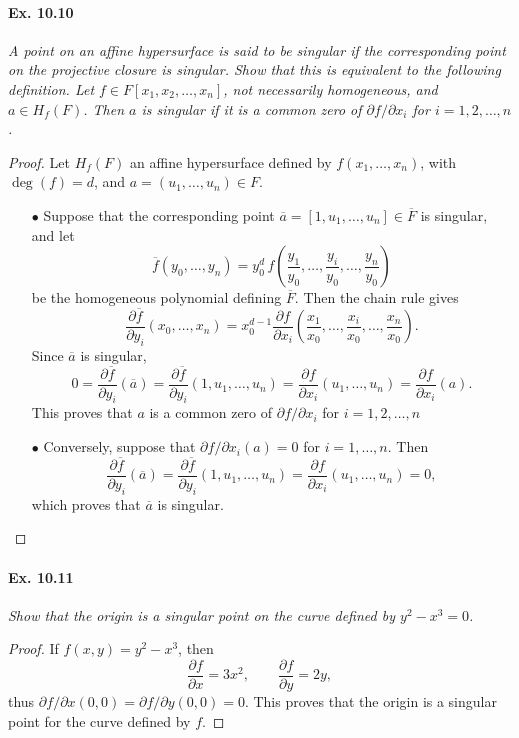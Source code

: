 \documentclass[11pt,a4paper]{article}
\begin{document}
\paragraph{Ex. 10.10} {\it A point on an affine hypersurface is said to be singular if the corresponding point on the projective closure is singular. Show that this is equivalent to the following definition. Let $f \in F[x_1,x_2,\ldots,x_n]$, not necessarily homogeneous, and $a \in H_f(F)$. Then $a$ is singular if it is a common zero of $\partial f/\partial x_i$ for $i=1,2,\ldots,n$.
}

\begin{proof}
Let $H_f(F)$ an affine hypersurface defined by $f(x_1,\ldots,x_n)$, with $\deg(f) = d$, and $a = (u_1,\ldots,u_n) \in F$.
\begin{enumerate} 
\item[$\bullet$] Suppose that the corresponding point $\overline{a} = [1,u_1,\ldots,u_n] \in \overline{F}$ is singular, and let
$$\overline{f}(y_0,\ldots,y_n) = y_0^d\, f\left(\frac{y_1}{y_0},\ldots,\frac{y_i}{y_0},\ldots,\frac{y_n}{y_0}\right)$$
be the homogeneous polynomial defining $\overline{F}$. Then the chain rule gives
$$\frac{\partial \overline{f}}{\partial y_i}(x_0,\ldots,x_n) = x_0^{d-1} \frac{\partial f}{\partial x_i}\left(\frac{x_1}{x_0},\ldots,\frac{x_i}{x_0},\ldots,\frac{x_n}{x_0}\right).$$
Since $\overline{a}$ is singular,
$$0 =  \frac{\partial \overline{f}}{\partial y_i}(\overline{a}) = \frac{\partial \overline{f}}{\partial y_i}(1,u_1,\ldots,u_n) = \frac{\partial f}{\partial x_i} (u_1,\ldots,u_n) =\frac{\partial f}{\partial x_i}(a).$$
This proves that $a$ is a common zero of $\partial f/\partial x_i$ for $i=1,2,\ldots,n$
\item[$\bullet$] Conversely, suppose that $\partial f/\partial x_i (a) = 0$ for $i=1,\ldots,n$. Then 
$$\frac{\partial \overline{f}}{\partial y_i}(\overline{a}) = \frac{\partial \overline{f}}{\partial y_i}(1,u_1,\ldots,u_n) =\frac{\partial f}{\partial x_i} (u_1,\ldots,u_n) =0,$$
which proves that $\overline{a}$ is singular.
\end{enumerate}
\end{proof}

\paragraph{Ex. 10.11} {\it Show that the origin is a singular point on the curve defined by $y^2 - x^3 = 0$.
}
\begin{proof}
If $f(x,y) = y^2 - x^3$, then
$$\frac{\partial f}{\partial x}  = 3x^2,\qquad \frac{\partial f}{\partial y} = 2y,$$
thus $\partial f/\partial x (0,0) = \partial f/\partial y (0,0) = 0$. This proves that the origin is a singular point for the curve defined by $f$.
\end{proof}
\end{document}
